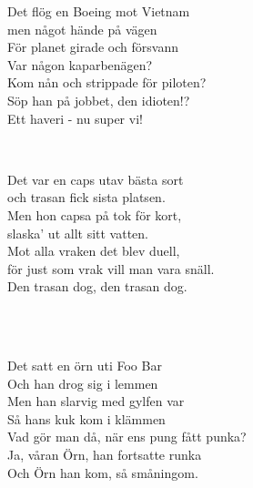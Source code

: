 \songtext{}Det flög en Boeing mot Vietnam \\
men något hände på vägen \\
För planet girade och försvann \\
Var någon kaparbenägen? \\
Kom nån och strippade för piloten? \\
Söp han på jobbet, den idioten!? \\
Ett haveri - nu super vi! \\

\newpage


 \\       

\songtext{}Det var en caps utav bästa sort\\
och trasan fick sista platsen.\\
Men hon capsa på tok för kort,\\
slaska' ut allt sitt vatten.\\
Mot alla vraken det blev duell,\\
för just som vrak vill man vara snäll.\\
Den trasan dog, den trasan dog.

\\


 \\       
\author{Text: Doomy}

\songtext{}Det satt en örn uti Foo Bar\\
Och han drog sig i lemmen\\ 
Men han slarvig med gylfen var\\ 
Så hans kuk kom i klämmen\\ 
Vad gör man då, när ens pung fått punka?\\ 
Ja, våran Örn, han fortsatte runka\\ 
Och Örn han kom, så småningom. \\


